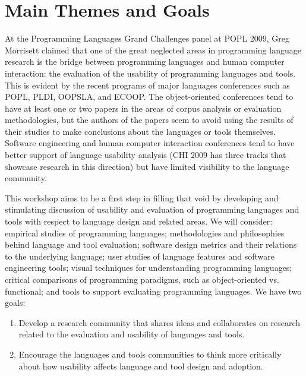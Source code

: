 \documentclass{acm_proc_article-sp}
\begin{document}



\section{Main Themes and Goals}

At the Programming Languages Grand Challenges panel at POPL 2009, Greg
Morrisett claimed that one of the great neglected areas in programming
language research is the bridge between programming languages and human computer interaction:
the evaluation of the usability of programming languages and tools. This
is evident by the recent programs of major languages
conferences such as POPL, PLDI, OOPSLA, and ECOOP. The object-oriented
conferences tend to have at least one or two papers in the areas of
corpus analysis or evaluation methodologies, but the authors of the
papers seem to avoid using the results of their studies to make
conclusions about the languages or tools themselves. Software
engineering and human computer interaction conferences tend to have better support
of language usability analysis (CHI 2009 has three tracks that showcase research in
this direction) but have limited visibility to the language community.

This workshop aims to be a first step in filling that void by
developing and stimulating discussion of usability and evaluation of
programming languages and tools with respect to language design and
related areas.  We will consider: empirical studies of programming
languages; methodologies and philosophies behind language and tool
evaluation; software design metrics and their relations to the
underlying language; user studies of language features and software
engineering tools; visual techniques for understanding programming
languages; critical comparisons of programming paradigms, such as
object-oriented vs. functional; and tools to support evaluating
programming languages.  We have two goals:

\begin{enumerate}
  \item 
Develop a research community that shares ideas and collaborates on 
research related to the evaluation and usability of languages and tools.
\item
Encourage the languages and tools communities to think more critically
about how usability affects language and tool design and
adoption.
\end{enumerate}
\end{document}
